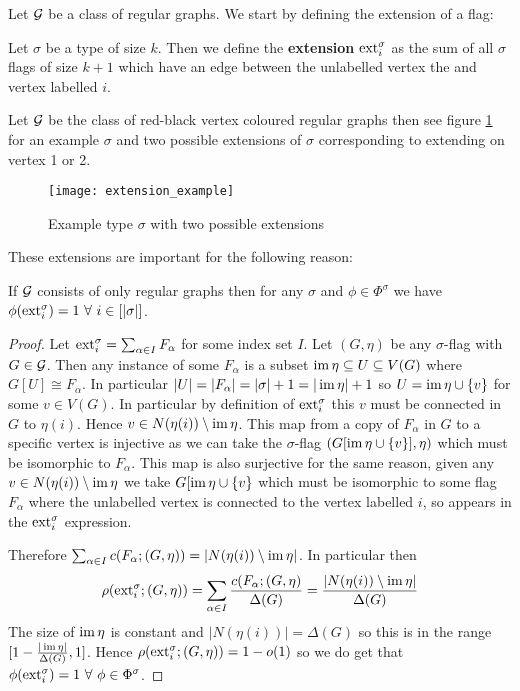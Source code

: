 Let $\mathcal{G}$ be a class of regular graphs.
We start by defining the extension of a flag:

\begin{definition}[Extension]
    Let $\sigma$ be a type of size $k$. Then we define the
    \textbf{extension} $\mathrm{ext}^\sigma_i$ as the sum of all $\sigma$ flags of
    size $k+1$ which have an edge between the unlabelled vertex the and vertex labelled $i$.
\end{definition}

\begin{example}
    Let $\mathcal{G}$ be the class of red-black vertex coloured regular graphs then
    see figure \ref{fig:extension_example} for an example $\sigma$ and two possible
    extensions of $\sigma$ corresponding to extending on vertex 1 or 2.
    \begin{figure}[h]
        \centering
        \texttt{[image: extension\_example]}
        \caption{Example type $\sigma$ with two possible extensions}
        \label{fig:extension_example}
    \end{figure}
\end{example}

These extensions are important for the following reason:

\begin{lemma}
    If $\mathcal{G}$ consists of only regular graphs then for any $\sigma$ and $\phi\in\Phi^\sigma$ we have
    $\phi(\mathrm{ext}_i^\sigma) = 1\ \forall\ i \in [|\sigma|]$.
\end{lemma}

\begin{proof}
    Let $\mathrm{ext}_i^\sigma=\sum_{\alpha\in I}F_\alpha$ for some index set $I$. Let
    $(G,\eta)$ be any $\sigma$-flag with $G\in\mathcal{G}$. Then any instance of some
    $F_\alpha$ is a subset $\operatorname{im}\eta \subseteq U \subseteq V(G)$ where
    $G[U] \cong F_\alpha$. In particular $|U|=|F_\alpha|=|\sigma|+1=|\operatorname{im}\eta| + 1$ so
    $U = \operatorname{im}\eta \cup \{v\}$ for some $v\in V(G)$. In particular by definition of
    $\mathrm{ext}_i^\sigma$ this $v$ must be connected in $G$ to $\eta(i)$. Hence
    $v \in N(\eta(i))\setminus \operatorname{im}\eta$. This map from a copy of $F_\alpha$ in $G$ to
    a specific vertex is injective as we can
    take the $\sigma$-flag $(G[\operatorname{im}\eta\cup\{v\}], \eta)$ which must be isomorphic
    to $F_\alpha$. This map is also surjective for the same reason, given any
    $v\in N(\eta(i)) \setminus \operatorname{im}\eta$ we take $G[\operatorname{im}\eta \cup \{v\}$ which must
    be isomorphic to some flag $F_\alpha$ where the unlabelled vertex is connected to
    the vertex labelled $i$, so appears in the $\mathrm{ext}_i^\sigma$ expression.

    Therefore $\sum_{\alpha\in I}c(F_\alpha; (G,\eta)) = |N(\eta(i))\setminus\operatorname{im}\eta|$.
    In particular then
    \[
        \rho(\mathrm{ext}_i^\sigma; (G,\eta))
        = \sum_{\alpha \in I} \frac{c(F_\alpha; (G,\eta)}{\Delta(G)}
        = \frac{|N(\eta(i)) \setminus \operatorname{im}\eta|}{\Delta(G)}
    \]
    The size of $\operatorname{im}\eta$ is constant and $|N(\eta(i))|=\Delta(G)$ so this is
    in the range $[1-\frac{|\operatorname{im}\eta|}{\Delta(G)}, 1]$. Hence
    $\rho(\mathrm{ext}^\sigma_i; (G,\eta)) = 1 - o(1)$ so we do get that
    $\phi(\ext_i^\sigma)=1\ \forall\ \phi\in\Phi^\sigma$.
\end{proof}

